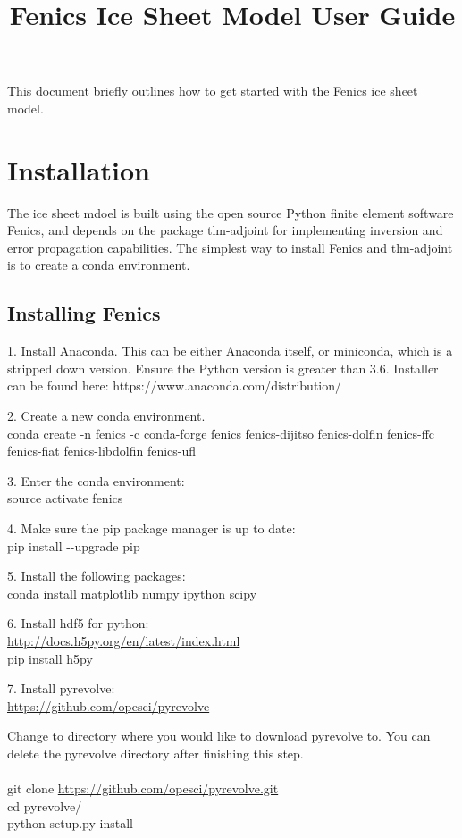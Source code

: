 \documentclass[11pt, reqno, nocenter]{article}
\title{Fenics Ice Sheet Model User Guide}
\begin{document}
\maketitle

This document briefly outlines how to get started with the Fenics ice sheet model. 

\tableofcontents 
\section{Installation}

The ice sheet mdoel is built using the open source Python finite element software Fenics, and depends on the package tlm-adjoint for implementing inversion and error propagation capabilities. The simplest way to install Fenics and tlm-adjoint is to create a conda environment. 

\subsection{Installing Fenics}
 
1. Install Anaconda. This can be either Anaconda itself, or miniconda, which is a stripped down version. Ensure the Python version is greater than 3.6. Installer can be found here: https://www.anaconda.com/distribution/ 

2. Create a new conda environment. \\
conda create -n fenics -c conda-forge fenics fenics-dijitso fenics-dolfin fenics-ffc fenics-fiat fenics-libdolfin fenics-ufl

3. Enter the conda environment: \\
source activate fenics

4. Make sure the pip package manager is up to date: \\
pip install -{}-upgrade pip

5. Install the following packages: \\
conda install matplotlib numpy ipython scipy 

6. Install hdf5 for python: \\
\url{http://docs.h5py.org/en/latest/index.html} \\
pip install h5py

7. Install pyrevolve: \\
\url{https://github.com/opesci/pyrevolve}

Change to directory where you would like to download pyrevolve to. You can delete the pyrevolve directory after finishing this step. \\ \\
git clone \url{https://github.com/opesci/pyrevolve.git} \\
cd pyrevolve/ \\
python setup.py install
\end{document}
